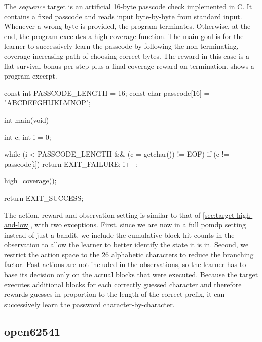 The \emph{sequence} target is an artificial 16-byte passcode check implemented in C.
It contains a fixed passcode and reads input byte-by-byte from standard input.
Whenever a wrong byte is provided, the program terminates.
Otherwise, at the end, the program executes a high-coverage function.
The main goal is for the learner to successively learn the passcode by following
the non-terminating, coverage-increasing path of choosing correct bytes.
The reward in this case is a flat survival bonus per step plus a final coverage
reward on termination.
 shows a program excerpt.

\begin{ccode}[float=htbp,
  caption={[The \emph{sequence} target]%
    An excerpt of the \emph{sequence} target.
    The read loop exits on the first byte that deviates from the passcode,
    while a correct passcode pays a high reward.},
  label={lst:target-sequence}]
const int PASSCODE_LENGTH = 16;
const char passcode[16] = "ABCDEFGHIJKLMNOP";

int main(void) {
    int c;
    int i = 0;

    while (i < PASSCODE_LENGTH && (c = getchar()) != EOF) {
        if (c != passcode[i]) {
            return EXIT_FAILURE;
        }
        i++;
    }

    high_coverage();

    return EXIT_SUCCESS;
}
\end{ccode}

The action, reward and observation setting is similar to that of \cref{sec:target-high-and-low}, with
two exceptions.
First, since we are now in a full \gls{pomdp} setting instead of just a bandit, we include
the cumulative block hit counts in the observation to allow the learner to better identify
the state it is in.
Second, we restrict the action space to the 26 alphabetic characters \code{[A-Z]}
to reduce the branching factor.
Past actions are not included in the observations, so the learner has to base its
decision only on the actual blocks that were executed.
Because the target executes additional blocks for each correctly guessed
character and therefore rewards guesses in proportion to the length of the
correct prefix, it can successively learn the password character-by-character.

\subsection{open62541}\label{sec:target-open62541}

